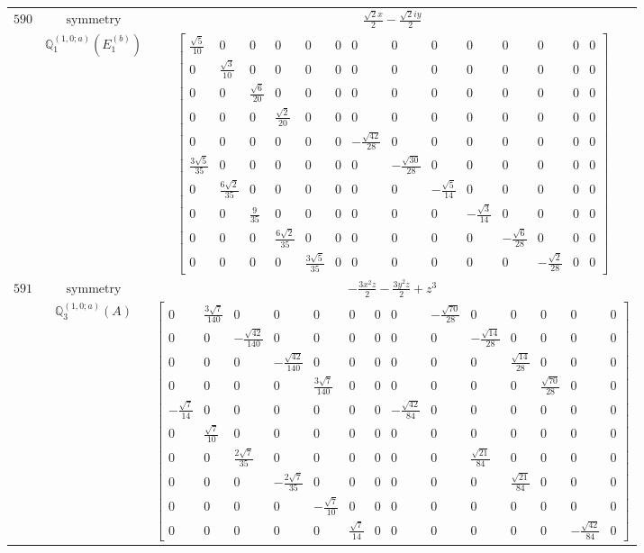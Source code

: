 \documentclass[fleqn,8pt,landscape]{jsarticle}
\begin{document}
\begin{longtable}{ccc}
$ 590 $ & $ \text{symmetry} $ & $ \frac{\sqrt{2} x}{2} - \frac{\sqrt{2} i y}{2} $ \\
$  $ & $ \mathbb{Q}_{1}^{(1,0;a)}(E_{1}^{(b)}) $ & $ \begin{bmatrix} \frac{\sqrt{5}}{10} & 0 & 0 & 0 & 0 & 0 & 0 & 0 & 0 & 0 & 0 & 0 & 0 & 0 \\ 0 & \frac{\sqrt{3}}{10} & 0 & 0 & 0 & 0 & 0 & 0 & 0 & 0 & 0 & 0 & 0 & 0 \\ 0 & 0 & \frac{\sqrt{6}}{20} & 0 & 0 & 0 & 0 & 0 & 0 & 0 & 0 & 0 & 0 & 0 \\ 0 & 0 & 0 & \frac{\sqrt{2}}{20} & 0 & 0 & 0 & 0 & 0 & 0 & 0 & 0 & 0 & 0 \\ 0 & 0 & 0 & 0 & 0 & 0 & - \frac{\sqrt{42}}{28} & 0 & 0 & 0 & 0 & 0 & 0 & 0 \\ \frac{3 \sqrt{5}}{35} & 0 & 0 & 0 & 0 & 0 & 0 & - \frac{\sqrt{30}}{28} & 0 & 0 & 0 & 0 & 0 & 0 \\ 0 & \frac{6 \sqrt{2}}{35} & 0 & 0 & 0 & 0 & 0 & 0 & - \frac{\sqrt{5}}{14} & 0 & 0 & 0 & 0 & 0 \\ 0 & 0 & \frac{9}{35} & 0 & 0 & 0 & 0 & 0 & 0 & - \frac{\sqrt{3}}{14} & 0 & 0 & 0 & 0 \\ 0 & 0 & 0 & \frac{6 \sqrt{2}}{35} & 0 & 0 & 0 & 0 & 0 & 0 & - \frac{\sqrt{6}}{28} & 0 & 0 & 0 \\ 0 & 0 & 0 & 0 & \frac{3 \sqrt{5}}{35} & 0 & 0 & 0 & 0 & 0 & 0 & - \frac{\sqrt{2}}{28} & 0 & 0 \end{bmatrix} $ \\ \hline
$ 591 $ & $ \text{symmetry} $ & $ - \frac{3 x^{2} z}{2} - \frac{3 y^{2} z}{2} + z^{3} $ \\
$  $ & $ \mathbb{Q}_{3}^{(1,0;a)}(A) $ & $ \begin{bmatrix} 0 & \frac{3 \sqrt{7}}{140} & 0 & 0 & 0 & 0 & 0 & 0 & - \frac{\sqrt{70}}{28} & 0 & 0 & 0 & 0 & 0 \\ 0 & 0 & - \frac{\sqrt{42}}{140} & 0 & 0 & 0 & 0 & 0 & 0 & - \frac{\sqrt{14}}{28} & 0 & 0 & 0 & 0 \\ 0 & 0 & 0 & - \frac{\sqrt{42}}{140} & 0 & 0 & 0 & 0 & 0 & 0 & \frac{\sqrt{14}}{28} & 0 & 0 & 0 \\ 0 & 0 & 0 & 0 & \frac{3 \sqrt{7}}{140} & 0 & 0 & 0 & 0 & 0 & 0 & \frac{\sqrt{70}}{28} & 0 & 0 \\ - \frac{\sqrt{7}}{14} & 0 & 0 & 0 & 0 & 0 & 0 & - \frac{\sqrt{42}}{84} & 0 & 0 & 0 & 0 & 0 & 0 \\ 0 & \frac{\sqrt{7}}{10} & 0 & 0 & 0 & 0 & 0 & 0 & 0 & 0 & 0 & 0 & 0 & 0 \\ 0 & 0 & \frac{2 \sqrt{7}}{35} & 0 & 0 & 0 & 0 & 0 & 0 & \frac{\sqrt{21}}{84} & 0 & 0 & 0 & 0 \\ 0 & 0 & 0 & - \frac{2 \sqrt{7}}{35} & 0 & 0 & 0 & 0 & 0 & 0 & \frac{\sqrt{21}}{84} & 0 & 0 & 0 \\ 0 & 0 & 0 & 0 & - \frac{\sqrt{7}}{10} & 0 & 0 & 0 & 0 & 0 & 0 & 0 & 0 & 0 \\ 0 & 0 & 0 & 0 & 0 & \frac{\sqrt{7}}{14} & 0 & 0 & 0 & 0 & 0 & 0 & - \frac{\sqrt{42}}{84} & 0 \end{bmatrix} $ \\ \hline

\end{longtable}
\end{document}
